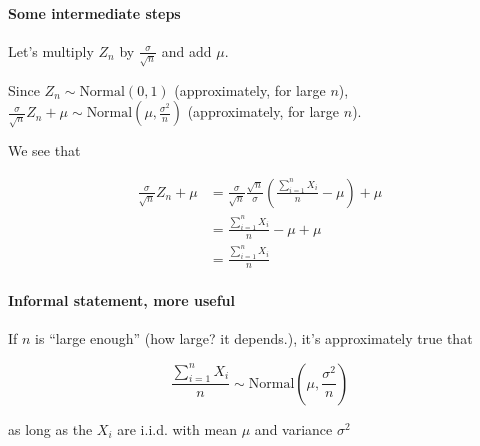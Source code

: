 \documentclass[]{article}
\let\oldparagraph\paragraph
\renewcommand{\paragraph}[1]{\oldparagraph{#1}\mbox{}}
\begin{document}
\paragraph{Some intermediate steps}\label{some-intermediate-steps}

Let's multiply \(Z_n\) by \(\frac{\sigma}{\sqrt{n}}\) and add \(\mu\).

Since \(Z_n \sim \text{Normal}(0, 1)\) (approximately, for large \(n\)),
\(\frac{\sigma}{\sqrt{n}} Z_n + \mu \sim \text{Normal}\left(\mu, \frac{\sigma^2}{n}\right)\)
(approximately, for large \(n\)).

We see that

\begin{align*}
\frac{\sigma}{\sqrt{n}} Z_n + \mu &= \frac{\sigma}{\sqrt{n}} \frac{\sqrt{n}}{\sigma}\left(\frac{\sum_{i=1}^n X_i}{n} - \mu\right) + \mu \\
 &= \frac{\sum_{i=1}^n X_i}{n} - \mu + \mu \\
 &= \frac{\sum_{i=1}^n X_i}{n}
\end{align*}

\paragraph{Informal statement, more
useful}\label{informal-statement-more-useful}

If \(n\) is ``large enough'' (how large? it depends.), it's
approximately true that

\[\frac{\sum_{i=1}^n X_i}{n} \sim \text{Normal}\left(\mu, \frac{\sigma^2}{n}\right)\]

as long as the \(X_i\) are i.i.d. with mean \(\mu\) and variance
\(\sigma^2\)
\end{document}
